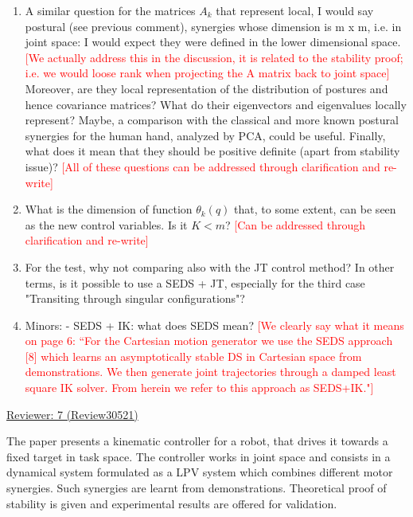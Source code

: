 \documentclass[10pt,stdletter,dateno]{newlfm}
\begin{document}
\begin{newlfm}
\begin{enumerate}
\item A similar question for the matrices $A_k$ that represent local, I
would say postural (see previous comment), synergies whose dimension is
m x m, i.e. in joint space: I would expect they were defined in the
lower dimensional space. \textcolor{red}{[We actually address this in the discussion, it is related to the stability proof; i.e. we would loose rank when projecting the A matrix back to joint space]} Moreover, are they local representation of the
distribution of postures and hence covariance matrices? What do their
eigenvectors and eigenvalues locally represent? Maybe, a comparison
with the classical and more known postural synergies for the human
hand, analyzed by PCA, could be useful. Finally, what does it mean that
they should be positive definite (apart from stability issue)? \textcolor{red}{[All of these questions can be addressed through clarification and re-write]}

\item What is the dimension of function $\theta_k(q)$ that, to some extent,
can be seen as the new control variables. Is it $K<m$? \textcolor{red}{[Can be addressed through clarification and re-write]}

\item For the test, why not comparing also with the JT control method? In
other terms, is it possible to use a SEDS + JT, especially for the
third case "Transiting through singular configurations"?

\item Minors:
- SEDS + IK: what does SEDS mean? \textcolor{red}{[We clearly say what it means on page 6: ``For the Cartesian motion generator we
use the SEDS approach [8] which learns an asymptotically
stable DS in Cartesian space from demonstrations. We then
generate joint trajectories through a damped least square IK
solver. From herein we refer to this approach as SEDS+IK."]}

\end{enumerate}


\underline{Reviewer: 7 (Review30521)}

The paper presents a kinematic controller for a robot, that drives it
towards a fixed target in task space. The controller works in joint
space and consists in a dynamical system formulated as a LPV system
which combines different motor synergies. Such synergies are learnt
from demonstrations. Theoretical proof of stability is given and
experimental results are offered for validation.


\end{newlfm}
\end{document}

